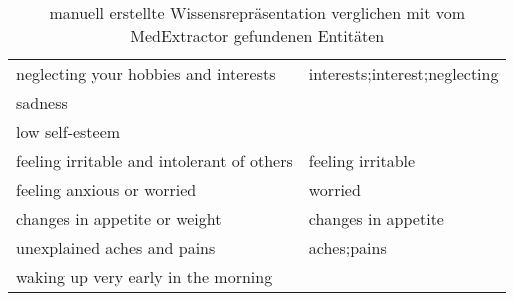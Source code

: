 \begin{table}
\begin{center}
\begin{tabular}{ll}
             neglecting your hobbies and interests & interests;interest;neglecting \\
                                           sadness &                               \\
                                   low self-esteem &                               \\
        feeling irritable and intolerant of others &             feeling irritable \\
                        feeling anxious or worried &                       worried \\
                     changes in appetite or weight &           changes in appetite \\
                       unexplained aches and pains &                   aches;pains \\
               waking up very early in the morning &                               \\
\bottomrule
\end{tabular}
\caption{manuell erstellte Wissensrepräsentation verglichen mit vom MedExtractor gefundenen Entitäten}
\label{tab:vergleich_manuell_medextractor}
\end{center}
\end{table}


